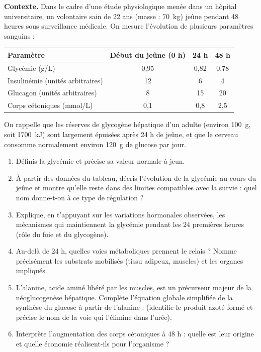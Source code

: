 \documentclass[11pt]{article}
\begin{document}
\begin{exercice}
\textbf{Contexte.} Dans le cadre d'une étude physiologique menée dans un hôpital universitaire, un volontaire sain de 22 ans (masse : \SI{70}{kg}) jeûne pendant 48 heures sous surveillance médicale. On mesure l'évolution de plusieurs paramètres sanguins :

\begin{center}
\begin{tabularx}{\linewidth}{|X|c|c|c|}
\hline
\rowcolor{poporange!40} \textbf{Paramètre} & \textbf{Début du jeûne (0 h)} & \textbf{24 h} & \textbf{48 h} \\
\hline
Glycémie (g/L) & 0,95 & 0,82 & 0,78 \\
\hline
Insulinémie (unités arbitraires) & 12 & 6 & 4 \\
\hline
Glucagon (unités arbitraires) & 8 & 15 & 20 \\
\hline
Corps cétoniques (mmol/L) & 0,1 & 0,8 & 2,5 \\
\hline
\end{tabularx}
\end{center}

On rappelle que les réserves de glycogène hépatique d'un adulte (environ \SI{100}{g}, soit \SI{1700}{kJ}) sont largement épuisées après 24 h de jeûne, et que le cerveau consomme normalement environ \SI{120}{g} de glucose par jour.

\begin{enumerate}
\item Définis la glycémie et précise sa valeur normale à jeun.
\item À partir des données du tableau, décris l'évolution de la glycémie au cours du jeûne et montre qu'elle reste dans des limites compatibles avec la survie : quel nom donne-t-on à ce type de régulation ?
\item Explique, en t'appuyant sur les variations hormonales observées, les mécanismes qui maintiennent la glycémie pendant les 24 premières heures (rôle du foie et du glycogène).
\item Au-delà de 24 h, quelles voies métaboliques prennent le relais ? Nomme précisément les substrats mobilisés (tissu adipeux, muscles) et les organes impliqués.
\item L'alanine, acide aminé libéré par les muscles, est un précurseur majeur de la néoglucogenèse hépatique. Complète l'équation globale simplifiée de la synthèse du glucose à partir de l'alanine :  (identifie le produit azoté formé et précise le nom de la voie qui l'élimine dans l'urée).
\item Interprète l'augmentation des corps cétoniques à 48 h : quelle est leur origine et quelle économie réalisent-ils pour l'organisme ?
\end{enumerate}
\end{exercice}
\end{document}
